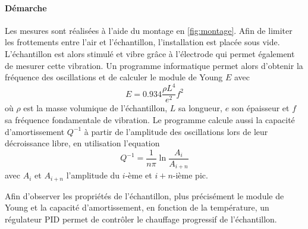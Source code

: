 \paragraph{Démarche} Les mesures sont réalisées à l'aide du montage en \autoref{fig:montage}. Afin de limiter les frottements entre l'air et l'échantillon, l'installation est placée sous vide. L'échantillon est alors stimulé et vibre grâce à l'électrode qui permet également de mesurer cette vibration. Un programme informatique permet alors d'obtenir la fréquence des oscillations et de calculer le module de Young \(E\) avec
\begin{equation}
    E = 0.934 \frac{\rho L^4}{e^2}f^2
    \label{eq:young_programme}
\end{equation}
où \(\rho\) est la masse volumique de l'échantillon, \(L\) sa longueur, \(e\) son épaisseur et \(f\) sa fréquence fondamentale de vibration. Le programme calcule aussi la capacité d'amortissement \(Q^{-1}\) à partir de l'amplitude des oscillations lors de leur décroissance libre, en utilisation l'equation
\begin{equation}
    Q^{-1} = \frac{1}{n \pi} \ln \frac{A_i}{A_{i+n}}
    \label{eq:q1_programme}
\end{equation}
avec \(A_i\) et \(A_{i+n}\) l'amplitude du \(i\)-ème et \(i+n\)-ième pic.

Afin d'observer les propriétés de l'échantillon, plus précisément le module de Young et la capacité d'amortissement, en fonction de la température, un régulateur PID permet de contrôler le chauffage progressif de l'échantillon.
